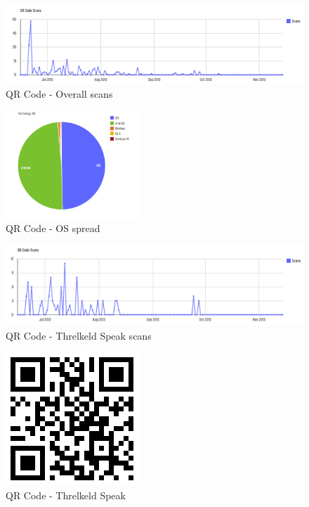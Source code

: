 \documentclass[a4paper,12pt]{article}
\begin{document}
\begin{figure}[ht!]
	\centering
	\includegraphics[width=150mm]{./images/OverallQRCodeDownload}
	\caption{QR Code - Overall scans}
	\label{QR-overall-access-overTime}
\end{figure}

\begin{figure}[ht!]
	\centering
	\includegraphics[width=50mm]{./images/OSAccess}
	\caption{QR Code - OS spread}
	\label{QR-OS-access}
\end{figure}

\begin{figure}[ht!]
	\centering
	\includegraphics[width=150mm]{./images/threkeld-scans}
	\caption{QR Code - Threlkeld Speak scans}
	\label{QR-threkeld}
\end{figure}

\begin{figure}[ht!]
	\centering
	\includegraphics[width=50mm]{./images/qrcode-threlkeld}
	\caption{QR Code - Threlkeld Speak}
	\label{QR-threkeld-barcode}
\end{figure}
\end{document}
